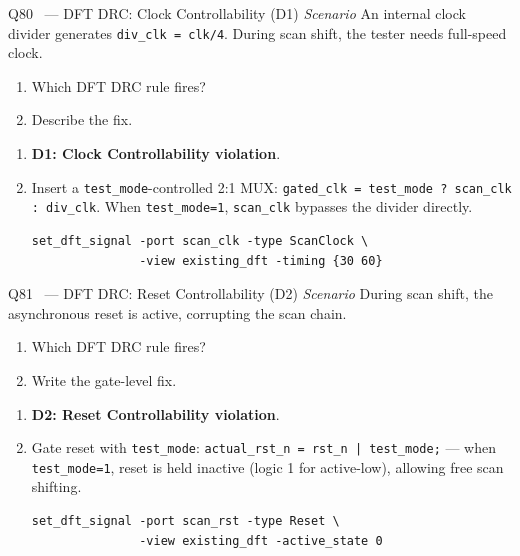 \documentclass[12pt,a4paper]{article}
\newcommand{\advanced}{%
  \fbox{\textcolor{advred}{\bfseries\sffamily\small ADVANCED}}}
\begin{document}
\begin{questionbox}{Q80 \advanced\ --- DFT DRC: Clock Controllability (D1) \hfill\textit{Scenario}}
An internal clock divider generates \texttt{div\_clk = clk/4}. During scan shift, the tester needs full-speed clock.
\begin{enumerate}[label=\textbf{\alph*)}]
  \item Which DFT DRC rule fires?
  \item Describe the fix.
\end{enumerate}
\end{questionbox}

\begin{answerbox}
\begin{enumerate}[label=\textbf{\alph*)}]
  \item \textbf{D1: Clock Controllability violation}.
  \item Insert a \texttt{test\_mode}-controlled 2:1 MUX: \texttt{gated\_clk = test\_mode ? scan\_clk : div\_clk}. When \texttt{test\_mode=1}, \texttt{scan\_clk} bypasses the divider directly.
\begin{lstlisting}[style=tclstyle]
set_dft_signal -port scan_clk -type ScanClock \
               -view existing_dft -timing {30 60}
\end{lstlisting}
\end{enumerate}
\end{answerbox}

\begin{questionbox}{Q81 \advanced\ --- DFT DRC: Reset Controllability (D2) \hfill\textit{Scenario}}
During scan shift, the asynchronous reset is active, corrupting the scan chain.
\begin{enumerate}[label=\textbf{\alph*)}]
  \item Which DFT DRC rule fires?
  \item Write the gate-level fix.
\end{enumerate}
\end{questionbox}

\begin{answerbox}
\begin{enumerate}[label=\textbf{\alph*)}]
  \item \textbf{D2: Reset Controllability violation}.
  \item Gate reset with \texttt{test\_mode}: \texttt{actual\_rst\_n = rst\_n | test\_mode;} --- when \texttt{test\_mode=1}, reset is held inactive (logic 1 for active-low), allowing free scan shifting.
\begin{lstlisting}[style=tclstyle]
set_dft_signal -port scan_rst -type Reset \
               -view existing_dft -active_state 0
\end{lstlisting}
\end{enumerate}
\end{answerbox}
\end{document}
